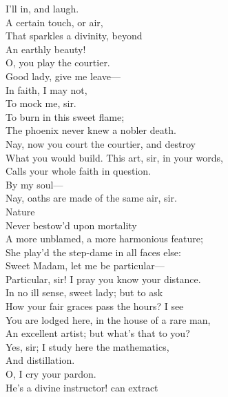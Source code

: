 \documentclass[a4paper,oneside]{memoir}
\begin{document}
\begin{drama*}
\facespeaks {} I'll in, and laugh.\\
\mammonspeaks A certain touch, or air,\\
That sparkles a divinity, beyond\\
An earthly beauty!\\
\dolspeaks {} O, you play the courtier.\\
\mammonspeaks Good lady, give me leave---\\
\dolspeaks {} In faith, I may not,\\
To mock me, sir.\\
\mammonspeaks {} To burn in this sweet flame;\\
The phoenix never knew a nobler death.\\
\dolspeaks Nay, now you court the courtier, and destroy\\
What you would build. This art, sir, in your words,\\
Calls your whole faith in question.\\
\mammonspeaks {} By my soul---\\
\dolspeaks Nay, oaths are made of the same air, sir.\\
\mammonspeaks {} Nature\\
Never bestow'd upon mortality\\
A more unblamed, a more harmonious feature;\\
She play'd the step-dame in all faces else:\\
Sweet Madam, let me be particular---\\
\dolspeaks Particular, sir! I pray you know your distance.\\
\mammonspeaks In no ill sense, sweet lady; but to ask\\
How your fair graces pass the hours? I see\\
You are lodged here, in the house of a rare man,\\
An excellent artist; but what's that to you?\\
\dolspeaks Yes, sir; I study here the mathematics,\\
And distillation.\\
\mammonspeaks {} O, I cry your pardon.\\
He's a divine instructor! can extract\\

\end{drama*}
\end{document}
